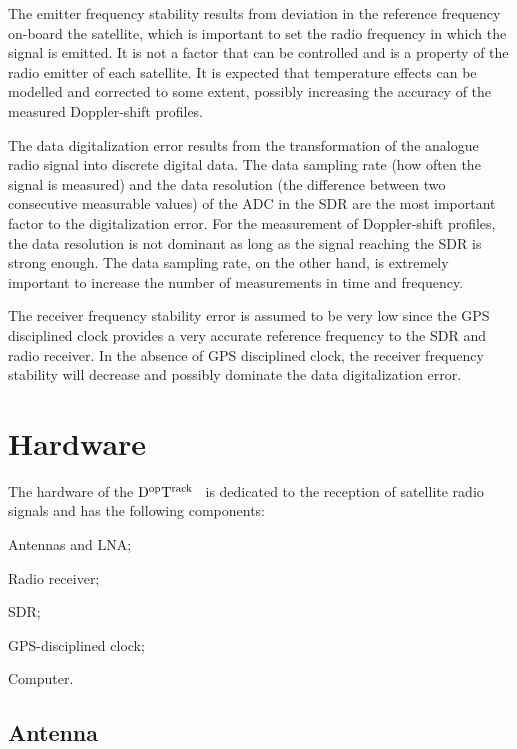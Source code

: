 \documentclass[11pt,a4paper,oneside]{article}
\newcommand{\GroundStationName}{${\rm D^{\rm op}T^{\rm rack}}$}
\newcommand{\listskip}{0pt}
\newenvironment{itemize*}
{\begin{itemize}
  \setlength{\itemsep}{\listskip}
  \setlength{\parskip}{\listskip}
  \setlength{\parsep}{\listskip}}
{\end{itemize}}
\begin{document}
The emitter frequency stability results from deviation in the reference frequency on-board the satellite, which is important to set the radio frequency in which the signal is emitted. It is not a factor that can be controlled and is a property of the radio emitter of each satellite. It is expected that temperature effects can be modelled and corrected to some extent, possibly increasing the accuracy of the measured Doppler-shift profiles.

The data digitalization error results from the transformation of the analogue radio signal into discrete digital data. The data sampling rate (how often the signal is measured) and the data resolution (the difference between two consecutive measurable values) of the \ac{ADC} in the \ac{SDR} are the most important factor to the digitalization error. For the measurement of Doppler-shift profiles, the data resolution is not dominant as long as the signal reaching the \ac{SDR} is strong enough. The data sampling rate, on the other hand, is extremely important to increase the number of measurements in time and frequency.

The receiver frequency stability error is assumed to be very low since the \ac{GPS} disciplined clock provides a very accurate reference frequency to the \ac{SDR} and radio receiver. In the absence of \ac{GPS} disciplined clock, the receiver frequency stability will decrease and possibly dominate the data digitalization error.



\section{Hardware}

The hardware of the \GroundStationName~ is dedicated to the reception of satellite radio signals and has the following components:

\begin{itemize*}
\item Antennas and \ac{LNA};
\item Radio receiver;
\item \ac{SDR};
\item \ac{GPS}-disciplined clock;
\item Computer.
\end{itemize*}



\subsection{Antenna}
\end{document}

